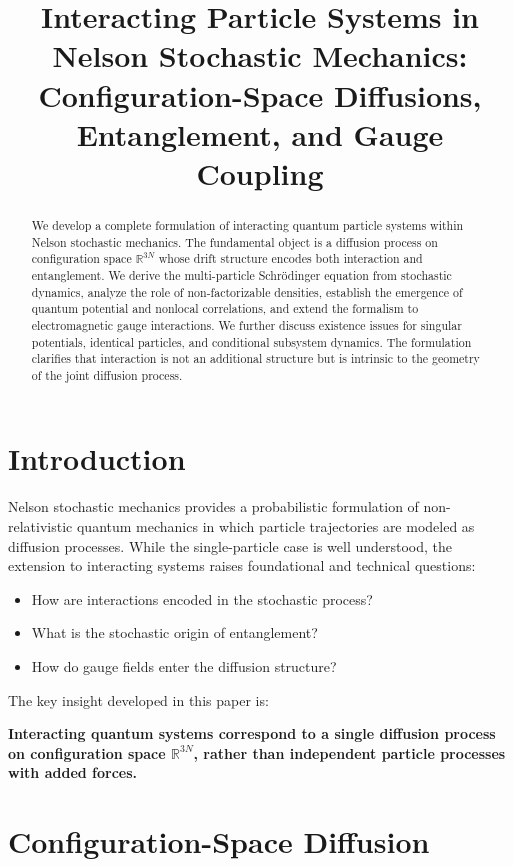 \documentclass[11pt]{article}
\title{Interacting Particle Systems in Nelson Stochastic Mechanics:\\
Configuration-Space Diffusions, Entanglement, and Gauge Coupling}
\author{}
\date{}
\begin{document}
\maketitle

\begin{abstract}
We develop a complete formulation of interacting quantum particle systems within Nelson stochastic mechanics. The fundamental object is a diffusion process on configuration space $\mathbb{R}^{3N}$ whose drift structure encodes both interaction and entanglement. We derive the multi-particle Schr\"odinger equation from stochastic dynamics, analyze the role of non-factorizable densities, establish the emergence of quantum potential and nonlocal correlations, and extend the formalism to electromagnetic gauge interactions. We further discuss existence issues for singular potentials, identical particles, and conditional subsystem dynamics. The formulation clarifies that interaction is not an additional structure but is intrinsic to the geometry of the joint diffusion process.
\end{abstract}

\section{Introduction}

Nelson stochastic mechanics provides a probabilistic formulation of non-relativistic quantum mechanics in which particle trajectories are modeled as diffusion processes. While the single-particle case is well understood, the extension to interacting systems raises foundational and technical questions:

\begin{itemize}
\item How are interactions encoded in the stochastic process?
\item What is the stochastic origin of entanglement?
\item How do gauge fields enter the diffusion structure?
\end{itemize}

The key insight developed in this paper is:

\medskip

\noindent
\textbf{Interacting quantum systems correspond to a single diffusion process on configuration space $\mathbb{R}^{3N}$, rather than independent particle processes with added forces.}

\medskip

\section{Configuration-Space Diffusion}
\end{document}
